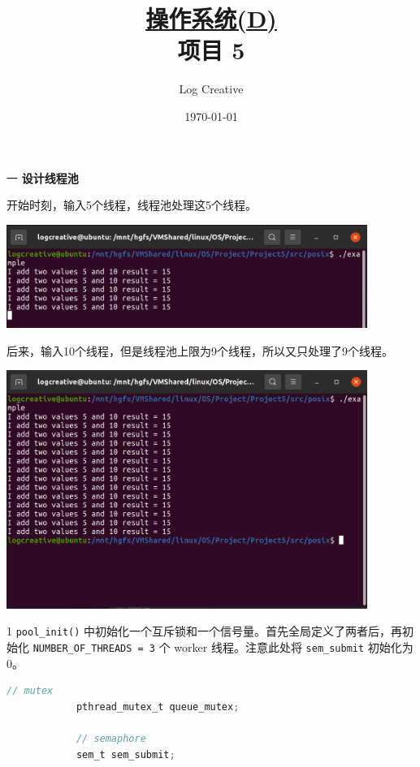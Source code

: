 \documentclass[12pt,a4paper]{article}
\newenvironment{problems}{\begin{list}{}{\renewcommand{\makelabel}[1]{\textbf{##1}\hfil}}}{\end{list}}
\newenvironment{steps}{\begin{list}{}{\renewcommand{\makelabel}[1]{##1.\hfil}}}{\end{list}}
\begin{document}
\title{\normalsize \underline{操作系统(D)}\\\LARGE 项目 5}
\author{Log Creative }
\date{\today}
\maketitle

\begin{problems}
    \item[一] \textbf{设计线程池}

    开始时刻，输入5个线程，线程池处理这5个线程。

    \includegraphics[width=0.88\textwidth]{threadpool1.png}

    后来，输入10个线程，但是线程池上限为9个线程，所以又只处理了9个线程。
    
    \includegraphics[width=0.88\textwidth]{threadpool2.png}

    \begin{steps}
        \item[1] \verb"pool_init()" 中初始化一个互斥锁和一个信号量。首先全局定义了两者后，再初始化 \verb"NUMBER_OF_THREADS = 3" 个 worker 线程。注意此处将 \verb"sem_submit" 初始化为 0。
        \begin{lstlisting}[language=c]
            // mutex
            pthread_mutex_t queue_mutex;

            // semaphore
            sem_t sem_submit;


\end{lstlisting}
\end{steps}
\end{problems}
\end{document}

